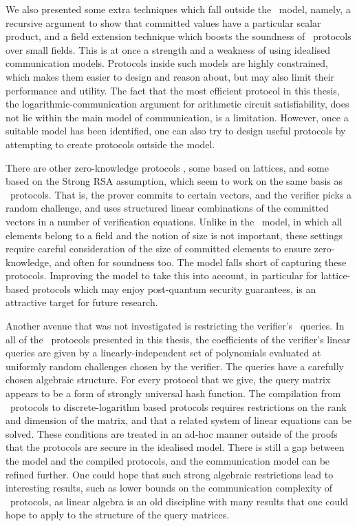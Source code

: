 We also presented some extra techniques which fall outside the \ILC\ model, namely, a recursive argument to show that committed values have a particular scalar product, and a field extension technique which boosts the soundness of \ILC\ protocols over small fields. This is at once a strength and a weakness of using idealised communication models. Protocols inside such models are highly constrained, which makes them easier to design and reason about, but may also limit their performance and utility. The fact that the most efficient protocol in this thesis, the logarithmic-communication argument for arithmetic circuit satisfiability, does not lie within the main model of communication, is a limitation. However, once a suitable model has been identified, one can also try to design useful protocols by attempting to create protocols outside the model.

There are other zero-knowledge protocols \cite{BaumBCPGL18}, some based on lattices, and some based on the Strong RSA assumption, which seem to work on the same basis as \ILC\ protocols. That is, the prover commits to certain vectors, and the verifier picks a random challenge, and uses structured linear combinations of the committed vectors in a number of verification equations. Unlike in the \ILC\ model, in which all elements belong to a field and the notion of size is not important, these settings require careful consideration of the size of committed elements to ensure zero-knowledge, and often for soundness too. The model falls short of capturing these protocols. Improving the model to take this into account, in particular for lattice-based protocols which may enjoy post-quantum security guarantees, is an attractive target for future research.

Another avenue that was not investigated is restricting the verifier's \ILC\ queries. In all of the \ILC\ protocols presented in this thesis, the coefficients of the verifier's linear queries are given by a linearly-independent set of polynomials evaluated at uniformly random challenges chosen by the verifier. The queries have a carefully chosen algebraic structure. For every protocol that we give, the query matrix appears to be a form of strongly universal hash function. The compilation from \ILC\ protocols to discrete-logarithm based protocols requires restrictions on the rank and dimension of the matrix, and that a related system of linear equations can be solved. These conditions are treated in an ad-hoc manner outside of the proofs that the protocols are secure in the idealised model. There is still a gap between the model and the compiled protocols, and the communication model can be refined further. One could hope that such strong algebraic restrictions lead to interesting results, such as lower bounds on the communication complexity of \ILC\ protocols, as linear algebra is an old discipline with many results that one could hope to apply to the structure of the query matrices.